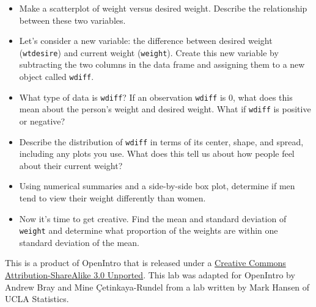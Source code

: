 \documentclass[]{article}
\begin{document}
\begin{itemize}
\item
  Make a scatterplot of weight versus desired weight. Describe the
  relationship between these two variables.
\item
  Let's consider a new variable: the difference between desired weight
  (\texttt{wtdesire}) and current weight (\texttt{weight}). Create this
  new variable by subtracting the two columns in the data frame and
  assigning them to a new object called \texttt{wdiff}.
\item
  What type of data is \texttt{wdiff}? If an observation \texttt{wdiff}
  is 0, what does this mean about the person's weight and desired
  weight. What if \texttt{wdiff} is positive or negative?
\item
  Describe the distribution of \texttt{wdiff} in terms of its center,
  shape, and spread, including any plots you use. What does this tell us
  about how people feel about their current weight?
\item
  Using numerical summaries and a side-by-side box plot, determine if
  men tend to view their weight differently than women.
\item
  Now it's time to get creative. Find the mean and standard deviation of
  \texttt{weight} and determine what proportion of the weights are
  within one standard deviation of the mean.
\end{itemize}

This is a product of OpenIntro that is released under a
\href{http://creativecommons.org/licenses/by-sa/3.0}{Creative Commons
Attribution-ShareAlike 3.0 Unported}. This lab was adapted for OpenIntro
by Andrew Bray and Mine Çetinkaya-Rundel from a lab written by Mark
Hansen of UCLA Statistics.
\end{document}
